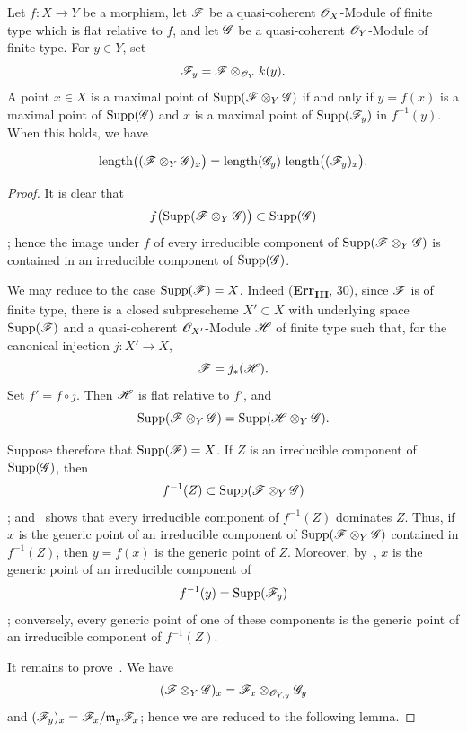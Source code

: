 \begin{proposition}[2.5.5]
\label{IV.2.5.5}
Let $f:X\to Y$ be a morphism, let $\mathscr{F}$ be a quasi-coherent
$\mathscr{O}_X$-Module of finite type which is flat relative to $f$, and let
$\mathscr{G}$ be a quasi-coherent $\mathscr{O}_Y$-Module of finite type. For
$y\in Y$, set
\[
  \mathscr{F}_y=\mathscr{F}\otimes_{\mathscr{O}_Y}k(y).
\]
A point $x\in X$ is a maximal point of
$\operatorname{Supp}(\mathscr{F}\otimes_Y\mathscr{G})$ if and only if
$y=f(x)$ is a maximal point of $\operatorname{Supp}(\mathscr{G})$ and $x$
is a maximal point of $\operatorname{Supp}(\mathscr{F}_y)$ in $f^{-1}(y)$.
When this holds, we have
\end{proposition}

\begin{env}[2.5.5.1]
\label{IV.2.5.5.1}
\[
  \operatorname{length}\bigl((\mathscr{F}\otimes_Y\mathscr{G})_x\bigr)
  =
  \operatorname{length}(\mathscr{G}_y)\,
  \operatorname{length}\bigl((\mathscr{F}_y)_x\bigr).
\]
\end{env}

\begin{proof}
It is clear that
\[
  f\bigl(\operatorname{Supp}(\mathscr{F}\otimes_Y\mathscr{G})\bigr)
  \subset \operatorname{Supp}(\mathscr{G})
\]
; hence the image under $f$ of every irreducible
component of $\operatorname{Supp}(\mathscr{F}\otimes_Y\mathscr{G})$ is contained
in an irreducible component of $\operatorname{Supp}(\mathscr{G})$.

  We may reduce to the case $\operatorname{Supp}(\mathscr{F})=X$. Indeed
  \textnormal{(}\textbf{Err}\textsubscript{\textbf{III}}, 30\textnormal{)},
  since $\mathscr{F}$ is of finite type, there is a closed subprescheme
  $X'\subset X$ with underlying space $\operatorname{Supp}(\mathscr{F})$ and a
  quasi-coherent $\mathscr{O}_{X'}$-Module $\mathscr{H}$ of finite type such that,
  for the canonical injection $j:X'\to X$,
  \[
    \mathscr{F}=j_*(\mathscr{H}).
  \]
  Set $f'=f\circ j$. Then $\mathscr{H}$ is flat relative to $f'$, and
  \[
    \operatorname{Supp}(\mathscr{F}\otimes_Y\mathscr{G})
    =
    \operatorname{Supp}(\mathscr{H}\otimes_Y\mathscr{G}).
  \]

  Suppose therefore that $\operatorname{Supp}(\mathscr{F})=X$. If $Z$ is an
  irreducible component of $\operatorname{Supp}(\mathscr{G})$, then
  \[
    f^{-1}(Z)\subset
    \operatorname{Supp}(\mathscr{F}\otimes_Y\mathscr{G})
  \]
  ; and~ shows that every irreducible
  component of $f^{-1}(Z)$ dominates $Z$. Thus, if $x$ is the generic
  point of an irreducible component of
  $\operatorname{Supp}(\mathscr{F}\otimes_Y\mathscr{G})$ contained in $f^{-1}(Z)$,
  then $y=f(x)$ is the generic point of $Z$. Moreover,
  by~, $x$ is the generic point of an irreducible
  component of
  \[
    f^{-1}(y)=\operatorname{Supp}(\mathscr{F}_y)
  \]
  ; conversely, every generic point of one of these
  components is the generic point of an irreducible component of
  $f^{-1}(Z)$.


It remains to prove~. We have
\[
  (\mathscr{F}\otimes_Y\mathscr{G})_x
  =
  \mathscr{F}_x\otimes_{\mathscr{O}_{Y,y}}\mathscr{G}_y
\]
 and
$(\mathscr{F}_y)_x=\mathscr{F}_x/\mathfrak{m}_y\mathscr{F}_x$; hence we are reduced to
the following lemma.
\end{proof}

